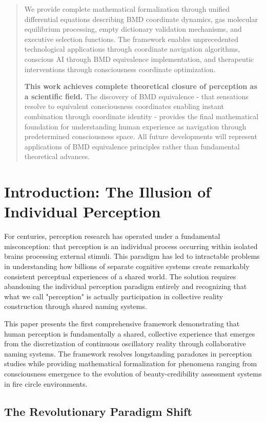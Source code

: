 \documentclass[12pt]{article}
\begin{document}
\begin{abstract}
We provide complete mathematical formalization through unified differential equations describing BMD coordinate dynamics, gas molecular equilibrium processing, empty dictionary validation mechanisms, and executive selection functions. The framework enables unprecedented technological applications through coordinate navigation algorithms, conscious AI through BMD equivalence implementation, and therapeutic interventions through consciousness coordinate optimization.

\textbf{This work achieves complete theoretical closure of perception as a scientific field.} The discovery of BMD equivalence - that sensations resolve to equivalent consciousness coordinates enabling instant combination through coordinate identity - provides the final mathematical foundation for understanding human experience as navigation through predetermined consciousness space. All future developments will represent applications of BMD equivalence principles rather than fundamental theoretical advances.
\end{abstract}

\section{Introduction: The Illusion of Individual Perception}

For centuries, perception research has operated under a fundamental misconception: that perception is an individual process occurring within isolated brains processing external stimuli. This paradigm has led to intractable problems in understanding how billions of separate cognitive systems create remarkably consistent perceptual experiences of a shared world. The solution requires abandoning the individual perception paradigm entirely and recognizing that what we call "perception" is actually participation in collective reality construction through shared naming systems.

This paper presents the first comprehensive framework demonstrating that human perception is fundamentally a shared, collective experience that emerges from the discretization of continuous oscillatory reality through collaborative naming systems. The framework resolves longstanding paradoxes in perception studies while providing mathematical formalization for phenomena ranging from consciousness emergence to the evolution of beauty-credibility assessment systems in fire circle environments.

\subsection{The Revolutionary Paradigm Shift}
\end{document}

